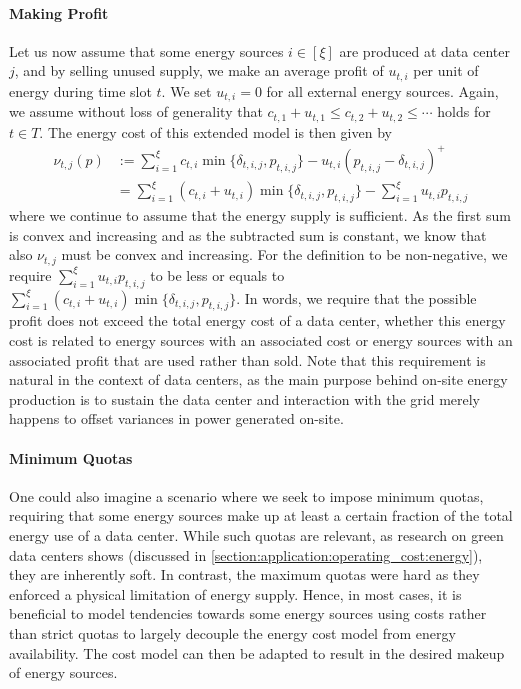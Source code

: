 \paragraph{Making Profit} Let us now assume that some energy sources $i \in [\xi]$ are produced at data center $j$, and by selling unused supply, we make an average profit of $u_{t,i}$ per unit of energy during time slot $t$. We set $u_{t,i} = 0$ for all external energy sources. Again, we assume without loss of generality that $c_{t,1} + u_{t,1} \leq c_{t,2} + u_{t,2} \leq \cdots$ holds for $t \in T$. The energy cost of this extended model is then given by \begin{align*}
    \nu_{t,j}(p) &:= \sum_{i=1}^{\xi} c_{t,i} \min\{\delta_{t,i,j}, p_{t,i,j}\} - u_{t,i} (p_{t,i,j} - \delta_{t,i,j})^+ \\
                 &= \sum_{i=1}^{\xi} (c_{t,i} + u_{t,i}) \min\{\delta_{t,i,j}, p_{t,i,j}\} - \sum_{i=1}^{\xi} u_{t,i} p_{t,i,j}
\end{align*} where we continue to assume that the energy supply is sufficient. As the first sum is convex and increasing and as the subtracted sum is constant, we know that also $\nu_{t,j}$ must be convex and increasing. For the definition to be non-negative, we require $\sum_{i=1}^{\xi} u_{t,i} p_{t,i,j}$ to be less or equals to $\sum_{i=1}^{\xi} (c_{t,i} + u_{t,i}) \min\{\delta_{t,i,j}, p_{t,i,j}\}$. In words, we require that the possible profit does not exceed the total energy cost of a data center, whether this energy cost is related to energy sources with an associated cost or energy sources with an associated profit that are used rather than sold. Note that this requirement is natural in the context of data centers, as the main purpose behind on-site energy production is to sustain the data center and interaction with the grid merely happens to offset variances in power generated on-site.

\paragraph{Minimum Quotas} One could also imagine a scenario where we seek to impose minimum quotas, requiring that some energy sources make up at least a certain fraction of the total energy use of a data center. While such quotas are relevant, as research on green data centers shows (discussed in \autoref{section:application:operating_cost:energy}), they are inherently soft. In contrast, the maximum quotas were hard as they enforced a physical limitation of energy supply. Hence, in most cases, it is beneficial to model tendencies towards some energy sources using costs rather than strict quotas to largely decouple the energy cost model from energy availability. The cost model can then be adapted to result in the desired makeup of energy sources.

